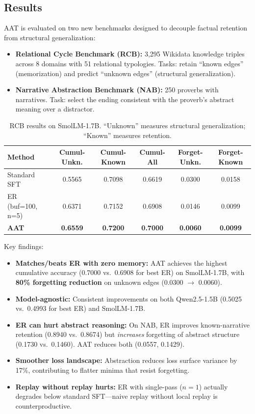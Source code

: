 \documentclass[11pt]{article}
\begin{document}
\subsection{Results}

AAT is evaluated on two new benchmarks designed to decouple factual retention from structural generalization:

\begin{itemize}
    \item \textbf{Relational Cycle Benchmark (RCB):} 3,295 Wikidata knowledge triples across 8 domains with 51 relational typologies. Tasks: retain ``known edges'' (memorization) and predict ``unknown edges'' (structural generalization).
    \item \textbf{Narrative Abstraction Benchmark (NAB):} 250 proverbs with narratives. Task: select the ending consistent with the proverb's abstract meaning over a distractor.
\end{itemize}

\begin{table}[h]
\centering
\caption{RCB results on SmolLM-1.7B. ``Unknown'' measures structural generalization; ``Known'' measures retention.}
\begin{tabular}{lccccc}
\toprule
\textbf{Method} & \textbf{Cumul-Unkn.} & \textbf{Cumul-Known} & \textbf{Cumul-All} & \textbf{Forget-Unkn.} & \textbf{Forget-Known} \\
\midrule
Standard SFT & 0.5565 & 0.7098 & 0.6619 & 0.0300 & 0.0158 \\
ER (buf=100, n=5) & 0.6371 & 0.7152 & 0.6908 & 0.0146 & 0.0099 \\
\textbf{AAT} & \textbf{0.6559} & \textbf{0.7200} & \textbf{0.7000} & \textbf{0.0060} & \textbf{0.0099} \\
\bottomrule
\end{tabular}
\end{table}

Key findings:
\begin{itemize}
    \item \textbf{Matches/beats ER with zero memory:} AAT achieves the highest cumulative accuracy (0.7000 vs.\ 0.6908 for best ER) on SmolLM-1.7B, with \textbf{80\% forgetting reduction} on unknown edges (0.0300 $\to$ 0.0060).
    \item \textbf{Model-agnostic:} Consistent improvements on both Qwen2.5-1.5B (0.5025 vs.\ 0.4993 for best ER) and SmolLM-1.7B.
    \item \textbf{ER can hurt abstract reasoning:} On NAB, ER improves known-narrative retention (0.8940 vs.\ 0.8674) but \textit{increases} forgetting of abstract structure (0.1730 vs.\ 0.1460). AAT reduces both (0.0557, 0.1429).
    \item \textbf{Smoother loss landscape:} Abstraction reduces loss surface variance by 17\%, contributing to flatter minima that resist forgetting.
    \item \textbf{Replay without replay hurts:} ER with single-pass ($n=1$) actually degrades below standard SFT---naive replay without local replay is counterproductive.
\end{itemize}
\end{document}
